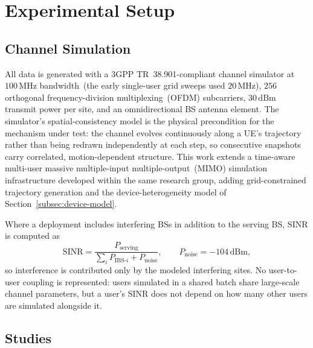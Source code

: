 \section{Experimental Setup}
\label{sec:setup}

\subsection{Channel Simulation}
\label{subsec:channel-simulation}

All data is generated with a 3GPP TR~38.901-compliant channel simulator %
at $100\,\text{MHz}$ bandwidth~(the early single-user grid sweeps used $20\,\text{MHz}$), $256$ orthogonal frequency-division multiplexing~(OFDM) subcarriers, $30\,\text{dBm}$ transmit power per site, and an omnidirectional BS antenna element. The simulator's spatial-consistency model is the physical precondition for the mechanism under test: the channel evolves continuously along a UE's trajectory rather than being redrawn independently at each step, so consecutive snapshots carry correlated, motion-dependent structure. This work extends a time-aware multi-user massive multiple-input multiple-output~(MIMO) simulation infrastructure developed within the same research group, adding grid-constrained trajectory generation and the device-heterogeneity model of Section~\ref{subsec:device-model}. %

Where a deployment includes interfering BSs in addition to the serving BS, SINR is computed as
\begin{equation}
  \mathrm{SINR} = \frac{P_{\text{serving}}}{\sum_i P_{\text{IBS-}i} + P_{\text{noise}}}, \qquad P_{\text{noise}} = -104\,\text{dBm},
  \label{eq:sinr}
\end{equation}
so interference is contributed only by the modeled interfering sites. No user-to-user coupling is represented: users simulated in a shared batch share large-scale channel parameters, but a user's SINR does not depend on how many other users are simulated alongside it.

\subsection{Studies}
\label{subsec:studies}

